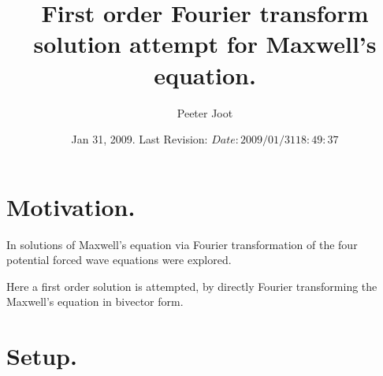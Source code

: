 \documentclass{article}
\title{ First order Fourier transform solution attempt for Maxwell's equation. }
\author{Peeter Joot}
\date{ Jan 31, 2009.  Last Revision: $Date: 2009/01/31 18:49:37 $ }
\begin{document}
\maketitle{}

\tableofcontents

\section{ Motivation. }

In \cite{PJfourierMaxwellSecondOrder} solutions of Maxwell's equation
via Fourier transformation of the four potential forced wave equations were
explored.

Here a first order solution is attempted, by directly Fourier transforming
the Maxwell's equation in bivector form.

\section{ Setup. }




\end{document}
